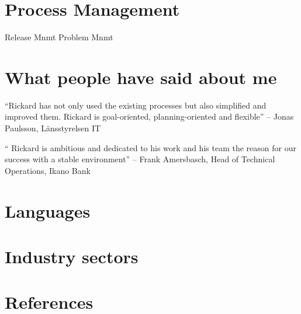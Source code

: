 \documentclass[11pt,a4paper,sans]{moderncv}
\begin{document}

\section{Process Management}
 {Release Mnmt}
 {Problem Mnmt}




\section{What people have said about me}

\begin{quotelist}
\item  ``Rickard has not only used the existing processes but also simplified and improved them.
        Rickard is goal-oriented, planning-oriented and flexible''  -- Jonas Paulsson, Länsstyrelsen IT
\item
        `` Rickard is ambitious and dedicated to his work and his team the reason for our success with a stable environment''  -- Frank Amersbasch, Head of Technical Operations, Ikano Bank
  \end{quotelist}

\section{Languages}

\section{Industry sectors}

\section{References}

\nocite{*}

\clearpage
\Large
\end{document}
